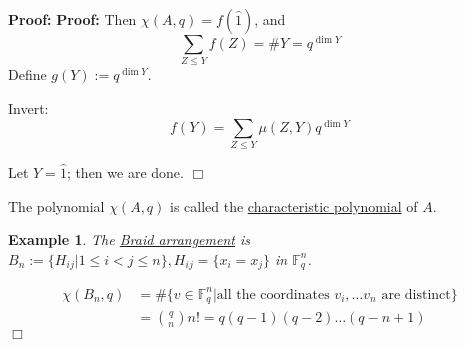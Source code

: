 \documentclass[11pt]{article}
\newtheorem{example}[theorem]{Example}
\newenvironment{proof}{\noindent \textbf{Proof:}}{$\Box$}
\newcommand{\F}{\mathbb F} %
\newcommand{\und}[1]{\underline{#1}}
\begin{document}
\begin{proof}
\begin{proof}
	Then $\chi(A,q) = f(\hat{1})$, and $$\sum_{Z \leq Y}f(Z) = \# Y = q^{\dim Y}$$
	Define $g(Y) := q^{\dim Y}$.
	
	Invert: $$f(Y) = \sum_{Z \leq Y} \mu(Z,Y) q^{\dim Y}$$
	
	Let $Y = \hat{1}$; then we are done.
\end{proof}

The polynomial $\chi(A,q)$ is called the \und{characteristic polynomial} of $A$.
\begin{example}
	The \und{Braid arrangement} is $B_n := \{ H_{ij} | 1 \le i < j \le n \}, H_{ij} = \{ x_i = x_j \}$ in $\F_q^n$.
\end{example}
\begin{align*}
\chi(B_n,q) &= \# \{ v \in \F_q^n | \text{all the coordinates } v_i, \ldots v_n \text{ are distinct} \} \\
&= {q \choose n} n! = q(q-1)(q-2)\ldots (q-n+1)
\end{align*}
\end{proof}
\end{document}
